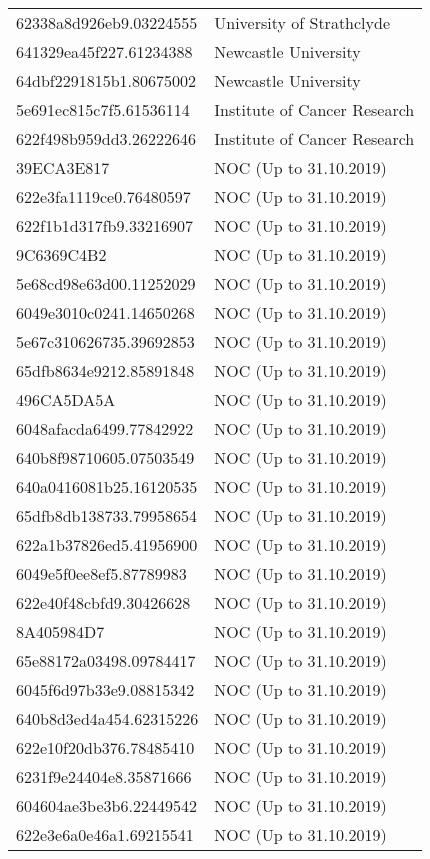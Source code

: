 \begin{tabular}{ll}
62338a8d926eb9.03224555 & University of Strathclyde \\
641329ea45f227.61234388 & Newcastle University \\
64dbf2291815b1.80675002 & Newcastle University \\
5e691ec815c7f5.61536114 & Institute of Cancer Research \\
622f498b959dd3.26222646 & Institute of Cancer Research \\
39ECA3E817 & NOC (Up to 31.10.2019) \\
622e3fa1119ce0.76480597 & NOC (Up to 31.10.2019) \\
622f1b1d317fb9.33216907 & NOC (Up to 31.10.2019) \\
9C6369C4B2 & NOC (Up to 31.10.2019) \\
5e68cd98e63d00.11252029 & NOC (Up to 31.10.2019) \\
6049e3010c0241.14650268 & NOC (Up to 31.10.2019) \\
5e67c310626735.39692853 & NOC (Up to 31.10.2019) \\
65dfb8634e9212.85891848 & NOC (Up to 31.10.2019) \\
496CA5DA5A & NOC (Up to 31.10.2019) \\
6048afacda6499.77842922 & NOC (Up to 31.10.2019) \\
640b8f98710605.07503549 & NOC (Up to 31.10.2019) \\
640a0416081b25.16120535 & NOC (Up to 31.10.2019) \\
65dfb8db138733.79958654 & NOC (Up to 31.10.2019) \\
622a1b37826ed5.41956900 & NOC (Up to 31.10.2019) \\
6049e5f0ee8ef5.87789983 & NOC (Up to 31.10.2019) \\
622e40f48cbfd9.30426628 & NOC (Up to 31.10.2019) \\
8A405984D7 & NOC (Up to 31.10.2019) \\
65e88172a03498.09784417 & NOC (Up to 31.10.2019) \\
6045f6d97b33e9.08815342 & NOC (Up to 31.10.2019) \\
640b8d3ed4a454.62315226 & NOC (Up to 31.10.2019) \\
622e10f20db376.78485410 & NOC (Up to 31.10.2019) \\
6231f9e24404e8.35871666 & NOC (Up to 31.10.2019) \\
604604ae3be3b6.22449542 & NOC (Up to 31.10.2019) \\
622e3e6a0e46a1.69215541 & NOC (Up to 31.10.2019) \\

\end{tabular}

